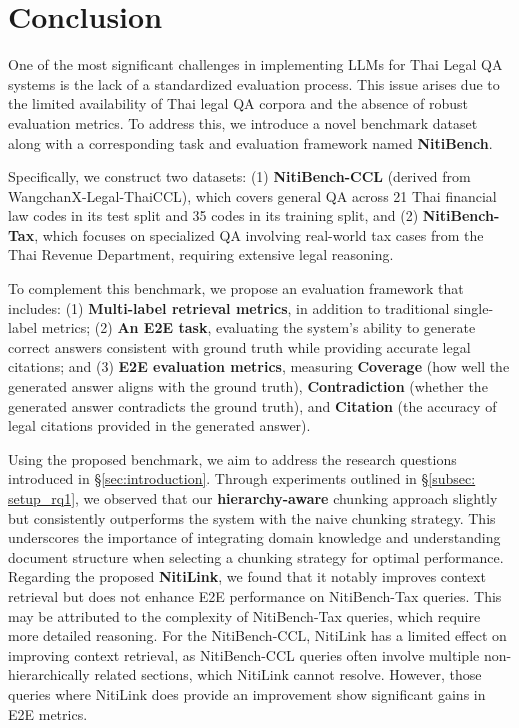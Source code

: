\section{Conclusion}
\label{sec: conclusion}
One of the most significant challenges in implementing LLMs for Thai Legal QA systems is the lack of a standardized evaluation process. This issue arises due to the limited availability of Thai legal QA corpora and the absence of robust evaluation metrics. To address this, we introduce a novel benchmark dataset along with a corresponding task and evaluation framework named \textbf{NitiBench}.

Specifically, we construct two datasets: (1) \textbf{NitiBench-CCL} (derived from WangchanX-Legal-ThaiCCL), which covers general QA across 21 Thai financial law codes in its test split and 35 codes in its training split, and (2) \textbf{NitiBench-Tax}, which focuses on specialized QA involving real-world tax cases from the Thai Revenue Department, requiring extensive legal reasoning.

To complement this benchmark, we propose an evaluation framework that includes: (1) \textbf{Multi-label retrieval metrics}, in addition to traditional single-label metrics; (2) \textbf{An E2E task}, evaluating the system’s ability to generate correct answers consistent with ground truth while providing accurate legal citations; and (3) \textbf{E2E evaluation metrics}, measuring \textbf{Coverage} (how well the generated answer aligns with the ground truth), \textbf{Contradiction} (whether the generated answer contradicts the ground truth), and \textbf{Citation} (the accuracy of legal citations provided in the generated answer).

Using the proposed benchmark, we aim to address the research questions introduced in \S\ref{sec:introduction}. Through experiments outlined in \S\ref{subsec: setup_rq1}, we observed that our \textbf{hierarchy-aware} chunking approach slightly but consistently outperforms the system with the naive chunking strategy. This underscores the importance of integrating domain knowledge and understanding document structure when selecting a chunking strategy for optimal performance. Regarding the proposed \textbf{NitiLink}, we found that it notably improves context retrieval but does not enhance E2E performance on NitiBench-Tax queries. This may be attributed to the complexity of NitiBench-Tax queries, which require more detailed reasoning. For the NitiBench-CCL, NitiLink has a limited effect on improving context retrieval, as NitiBench-CCL queries often involve multiple non-hierarchically related sections, which NitiLink cannot resolve. However, those queries where NitiLink does provide an improvement show significant gains in E2E metrics.

